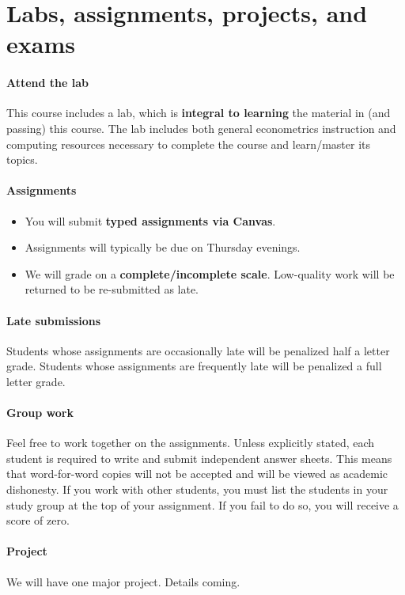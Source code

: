 \documentclass[10pt]{article}
\newcommand{\emf}[1]{\textbf{\textcolor{grass_green}{#1}}}
\begin{document}
\section*{Labs, assignments, projects, and exams}

\paragraph{Attend the lab} This course includes a lab, which is \emf{integral to learning} the material in (and passing) this course. The lab includes both general econometrics instruction and computing resources necessary to complete the course and learn/master its topics.

\paragraph{Assignments}
\begin{itemize}
  \item You will submit \emf{typed assignments via Canvas}.
  \item Assignments will typically be due on Thursday evenings.
  \item We will grade on a \emf{complete/incomplete scale}. Low-quality work will be returned to be re-submitted as late.
\end{itemize}

\paragraph{Late submissions} Students whose assignments are occasionally late will be penalized half a letter grade. Students whose assignments are frequently late will be penalized a full letter grade.

\paragraph{Group work} Feel free to work together on the assignments. Unless explicitly stated, each student is required to write and submit independent answer sheets. This means that word-for-word copies will not be accepted and will be viewed as academic dishonesty. If you work with other students, you must list the students in your study group at the top of your assignment. If you fail to do so, you will receive a score of zero.

\paragraph{Project} We will have one major project. Details coming.
\end{document}
